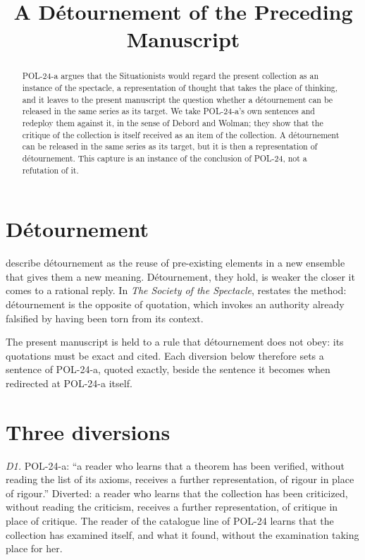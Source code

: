 \documentclass{situationist-preprint}
\title{A Détournement of the Preceding Manuscript}
\begin{document}
\maketitle

\begin{abstract}
POL-24-a argues that the Situationists would regard the present collection as an instance of the spectacle, a representation of thought that takes the place of thinking, and it leaves to the present manuscript the question whether a détournement can be released in the same series as its target. We take POL-24-a's own sentences and redeploy them against it, in the sense of Debord and Wolman; they show that the critique of the collection is itself received as an item of the collection. A détournement can be released in the same series as its target, but it is then a representation of détournement. This capture is an instance of the conclusion of POL-24, not a refutation of it.
\end{abstract}

\section{Détournement}

\citet{DebordWolman1956} describe détournement as the reuse of pre-existing elements in a new ensemble that gives them a new meaning. Détournement, they hold, is weaker the closer it comes to a rational reply. In \emph{The Society of the Spectacle}, \citet[theses~206--209]{Debord1967} restates the method: détournement is the opposite of quotation, which invokes an authority already falsified by having been torn from its context.

The present manuscript is held to a rule that détournement does not obey: its quotations must be exact and cited. Each diversion below therefore sets a sentence of POL-24-a, quoted exactly, beside the sentence it becomes when redirected at POL-24-a itself.

\section{Three diversions}

\emph{D1.} POL-24-a: \enquote{a reader who learns that a theorem has been verified, without reading the list of its axioms, receives a further representation, of rigour in place of rigour.} Diverted: a reader who learns that the collection has been criticized, without reading the criticism, receives a further representation, of critique in place of critique. The reader of the catalogue line of POL-24 learns that the collection has examined itself, and what it found, without the examination taking place for her.
\end{document}
